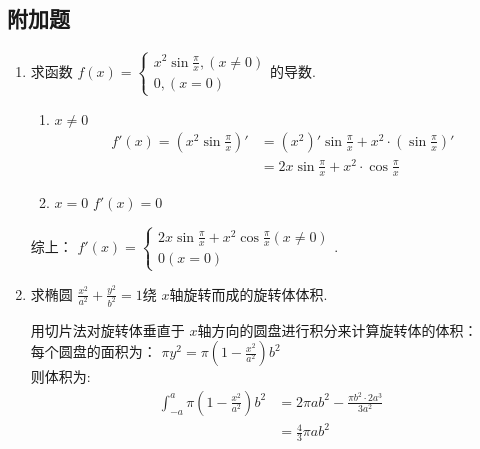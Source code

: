 \documentclass[answers]{exam}
\begin{document}
\begin{questions}
	\section*{附加题}
	\question
	\begin{enumerate}[label=(\arabic*)]
		\item 求函数 \( f(x) = \begin{cases}
			      x^2\sin\frac{\pi}{x}, (x \neq 0) \\
			      0, (x=0)
		      \end{cases} \)的导数.

		      \begin{solution}
			      \begin{enumerate}[label=\arabic*)]
				      \item \( x \neq 0 \)
				            \begin{align*}
					            f'(x) = (x^2\sin\frac{\pi}{x})' & = (x^2)'\sin\frac{\pi}{x} + x^2\cdot(\sin\frac{\pi}{x})' \\
					                                            & = 2x\sin\frac{\pi}{x} + x^2\cdot\cos\frac{\pi}{x}
				            \end{align*}
				      \item \( x = 0 \)
				            \begin{math}
					            f'(x) = 0
				            \end{math}
			      \end{enumerate}
			      综上：
			      \begin{math}
				      f'(x) =
				      \begin{cases}
					      2x\sin\frac{\pi}{x} + x^2\cos\frac{\pi}{x} (x \neq 0) \\
					      0 (x = 0)
				      \end{cases}.
			      \end{math}
		      \end{solution}

		\item 求椭圆 \( \frac{x^2}{a^2} + \frac{y^2}{b^2} = 1 \)绕 $x$轴旋转而成的旋转体体积.
		      \begin{solution}
			      用切片法对旋转体垂直于 \( x \)轴方向的圆盘进行积分来计算旋转体的体积：\\
			      每个圆盘的面积为： \( \pi y^2 = \pi (1-\frac{x^2}{a^2})b^2 \) \\
			      则体积为:
			      \begin{align*}
				      \int_{-a}^{a}\pi(1-\frac{x^2}{a^2})b^2 & = 2\pi ab^2 - \frac{\pi b^2\cdot 2a^3}{3a^2} \\
				                                             & = \frac{4}{3}\pi ab^2
			      \end{align*}


\end{solution}
\end{enumerate}
\end{questions}
\end{document}
